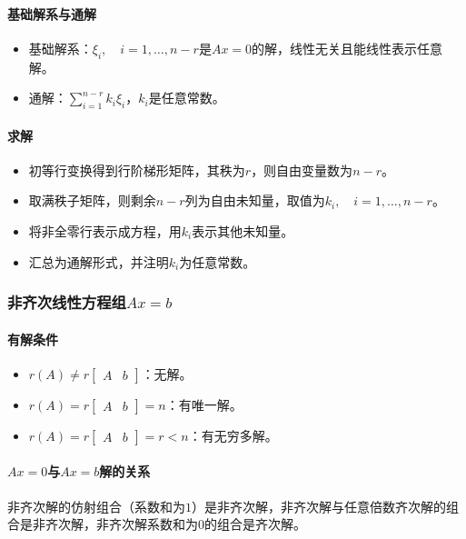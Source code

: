 \documentclass[
12pt, %
a4paper, 
oneside, %
]{scrartcl}
\begin{document}
\paragraph{基础解系与通解}
\begin{itemize}
\item 基础解系：$ \xi_i, \quad i = 1, \dots, n - r $是$ Ax = 0 $的解，线性无关且能线性表示任意解。
\item 通解：$ \sum_{i = 1}^{n - r} k_i \xi_i $，$ k_i $是任意常数。
\end{itemize}
\paragraph{求解}
\begin{itemize}
\item 初等行变换得到行阶梯形矩阵，其秩为$ r $，则自由变量数为$ n - r $。
\item 取满秩子矩阵，则剩余$ n - r $列为自由未知量，取值为$ k_i, \quad i = 1, \dots, n - r $。
\item 将非全零行表示成方程，用$ k_i $表示其他未知量。
\item 汇总为通解形式，并注明$ k_i $为任意常数。
\end{itemize}
\subsubsection[非齐次线性方程组]{非齐次线性方程组$ Ax = b $}
\paragraph{有解条件}
\begin{itemize}
\item $ r(A) \neq r \begin{bmatrix} A & b \end{bmatrix} $：无解。
\item $ r(A) = r \begin{bmatrix} A & b \end{bmatrix} = n $：有唯一解。
\item $ r(A) = r \begin{bmatrix} A & b \end{bmatrix} = r < n $：有无穷多解。
\end{itemize}
\paragraph{$ Ax = 0 $与$ Ax = b $解的关系}
非齐次解的仿射组合（系数和为$ 1 $）是非齐次解，非齐次解与任意倍数齐次解的组合是非齐次解，非齐次解系数和为$ 0 $的组合是齐次解。
\end{document}
